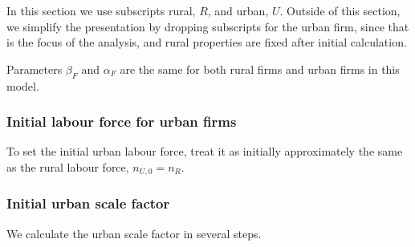 In this section we use subscripts rural, $R$, and urban, $U$. Outside of this section, we simplify the presentation by dropping subscripts for the urban firm, since that is the focus of the analysis, and rural properties are fixed after initial calculation. 

Parameters $\beta_F$ and $\alpha_F$ are the same for both rural firms and urban firms in this model. 

\subsubsection{Initial labour force for urban firms}
To set the initial urban labour force, treat it as initially approximately the same as the rural labour force,  $n_{U,0}=n_R$. %




\subsubsection{Initial urban scale factor}


We calculate the urban scale factor in several steps.

